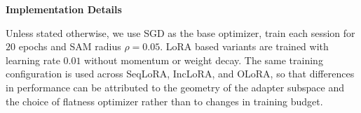 \documentclass[10pt]{article} %
\begin{document}





 

\textbf{Implementation Details}

Unless stated otherwise, we use SGD as the base optimizer, train each session for $20$ epochs and SAM radius $\rho = 0.05$. LoRA based variants are trained with learning rate $0.01$ without momentum or weight decay. The same training configuration is used across SeqLoRA, IncLoRA, and OLoRA, so that differences in performance can be attributed to the geometry of the adapter subspace and the choice of flatness optimizer rather than to changes in training budget.

\end{document}
